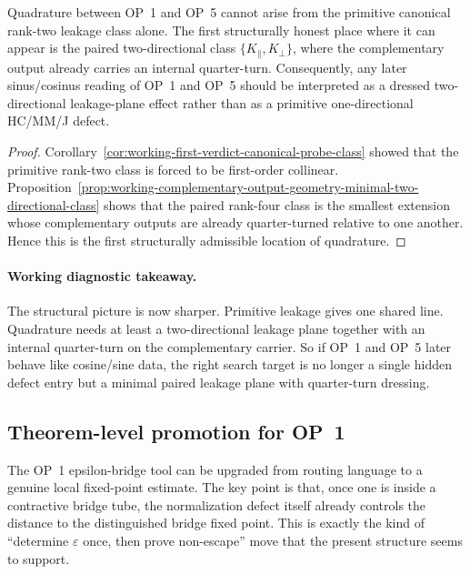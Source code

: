 \begin{corollary}
\label{cor:working-first-place-where-quadrature-becomes-possible}
Quadrature between OP~1 and OP~5 cannot arise from the primitive canonical rank-two leakage class alone. The first structurally honest place where it can appear is the paired two-directional class $\{K_{\parallel},K_{\perp}\}$, where the complementary output already carries an internal quarter-turn. Consequently, any later sinus/cosinus reading of OP~1 and OP~5 should be interpreted as a dressed two-directional leakage-plane effect rather than as a primitive one-directional HC/MM/J defect.
\end{corollary}

\begin{proof}
Corollary~\ref{cor:working-first-verdict-canonical-probe-class} showed that the primitive rank-two class is forced to be first-order collinear. Proposition~\ref{prop:working-complementary-output-geometry-minimal-two-directional-class} shows that the paired rank-four class is the smallest extension whose complementary outputs are already quarter-turned relative to one another. Hence this is the first structurally admissible location of quadrature.
\end{proof}

\paragraph{Working diagnostic takeaway.}
The structural picture is now sharper. Primitive leakage gives one shared line. Quadrature needs at least a two-directional leakage plane together with an internal quarter-turn on the complementary carrier. So if OP~1 and OP~5 later behave like cosine/sine data, the right search target is no longer a single hidden defect entry but a minimal paired leakage plane with quarter-turn dressing.

\subsection*{Theorem-level promotion for OP~1}
The OP~1 epsilon-bridge tool can be upgraded from routing language to a genuine local fixed-point estimate. The key point is that, once one is inside a contractive bridge tube, the normalization defect itself already controls the distance to the distinguished bridge fixed point. This is exactly the kind of ``determine \(\varepsilon\) once, then prove non-escape'' move that the present structure seems to support.


